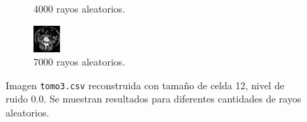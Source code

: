\documentclass{beamer}
\begin{document}
\begin{frame}
\begin{figure}
\begin{subfigure}{0.4\linewidth}
  \caption{4000 rayos aleatorios.}
\end{subfigure}%
\begin{subfigure}{0.4\linewidth}
  \centering
  \includegraphics[width=0.6\linewidth]{rayos/tomo3-aleat7000}
  \caption{7000 rayos aleatorios.}
\end{subfigure}%
\caption{Imagen \texttt{tomo3.csv} reconstruida con tamaño de celda 12, nivel de ruido 0.0. Se 
muestran resultados para diferentes cantidades de rayos aleatorios.}
\label{fig:muestras_aleat}
\end{figure}
\end{frame}
\end{document}
